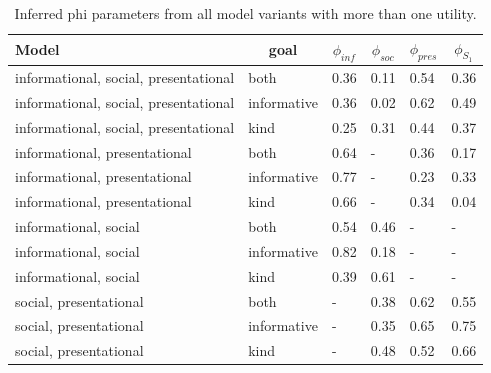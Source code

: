 \documentclass[12pt]{article}
\begin{document}
\begin{table}[tbp]
\begin{center}
\begin{threeparttable}
\caption{\label{tab:phi}Inferred phi parameters from all model variants with more than one utility.}
\begin{tabular}{llllll}
\toprule
Model & \multicolumn{1}{c}{goal} & \multicolumn{1}{c}{$\phi_{inf}$} & \multicolumn{1}{c}{$\phi_{soc}$} & \multicolumn{1}{c}{$\phi_{pres}$} & \multicolumn{1}{c}{$\phi_{S_1}$}\\
\midrule
informational, social, presentational & both & 0.36 & 0.11 & 0.54 & 0.36\\
informational, social, presentational & informative & 0.36 & 0.02 & 0.62 & 0.49\\
informational, social, presentational & kind & 0.25 & 0.31 & 0.44 & 0.37\\
informational, presentational & both & 0.64 & - & 0.36 & 0.17\\
informational, presentational & informative & 0.77 & - & 0.23 & 0.33\\
informational, presentational & kind & 0.66 & - & 0.34 & 0.04\\
informational, social & both & 0.54 & 0.46 & - & -\\
informational, social & informative & 0.82 & 0.18 & - & -\\
informational, social & kind & 0.39 & 0.61 & - & -\\
social, presentational & both & - & 0.38 & 0.62 & 0.55\\
social, presentational & informative & - & 0.35 & 0.65 & 0.75\\
social, presentational & kind & - & 0.48 & 0.52 & 0.66\\
\bottomrule
\end{tabular}
\end{threeparttable}
\end{center}
\end{table}
\end{document}

